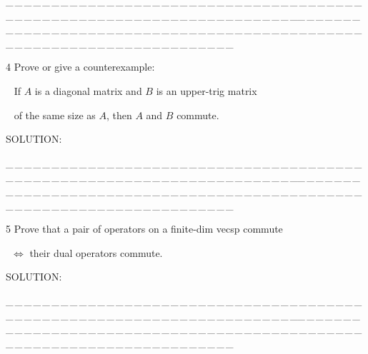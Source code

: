 \documentclass[a4paper, 11pt, UTF8]{article}
\begin{document}
\begin{large}
\par
{\tiny \_\,\_\,\_\,\_\,\_\,\_\,\_\,\_\,\_\,\_\,\_\,\_\,\_\,\_\,\_\,\_\,\_\,\_\,\_\,\_\,\_\,\_\,\_\,\_\,\_\,\_\,\_\,\_\,\_\,\_\,\_\,\_\,\_\,\_\,\_\,\_\,\_\,\_\,\_\,\_\,\_\,\_\,\_\,\_\,\_\,\_\,\_\,\_\,\_\,\_\,\_\,\_\,\_\,\_\,\_\,\_\,\_\,\_\,\_\,\_\,\_\,\_\,\_\,\_\,\_\,\_\,\_\,\_\,\_\,\_\,\_\_\,\_\,\_\,\_\,\_\,\_\,\_\,\_\,\_\,\_\,\_\,\_\,\_\,\_\,\_\,\_\,\_\,\_\,\_\,\_\,\_\,\_\,\_\,\_\,\_\,\_\,\_\,\_\,\_\,\_\,\_\,\_\,\_\,\_\,\_\,\_\,\_\,\_\,\_\,\_\,\_\,\_\,\_\,\_\,\_\,\_\,\_\,\_\,\_\,\_\,\_\,\_\,\_\,\_\,\_\,\_\,\_\,\_\,\_\,\_\,\_\,\_\,\_\,\_\,\_\,\_\,\_\,\_\,\_\,\_\,\_}\par

{\timesbf\Large 4} {\timessl\Large 
Prove or give a counterexample:}\par\,\,\,
{\timessl\Large If $A$ is a diagonal matrix and $B$ is an upper-trig matrix}\par\,\,\,
{\timessl\Large of the same size as $A$, then $A$ and $B$ commute.
}\par
{\timesbf S\footnotesize{OLUTION:}}\par\quad

\par
{\tiny \_\,\_\,\_\,\_\,\_\,\_\,\_\,\_\,\_\,\_\,\_\,\_\,\_\,\_\,\_\,\_\,\_\,\_\,\_\,\_\,\_\,\_\,\_\,\_\,\_\,\_\,\_\,\_\,\_\,\_\,\_\,\_\,\_\,\_\,\_\,\_\,\_\,\_\,\_\,\_\,\_\,\_\,\_\,\_\,\_\,\_\,\_\,\_\,\_\,\_\,\_\,\_\,\_\,\_\,\_\,\_\,\_\,\_\,\_\,\_\,\_\,\_\,\_\,\_\,\_\,\_\,\_\,\_\,\_\,\_\,\_\_\,\_\,\_\,\_\,\_\,\_\,\_\,\_\,\_\,\_\,\_\,\_\,\_\,\_\,\_\,\_\,\_\,\_\,\_\,\_\,\_\,\_\,\_\,\_\,\_\,\_\,\_\,\_\,\_\,\_\,\_\,\_\,\_\,\_\,\_\,\_\,\_\,\_\,\_\,\_\,\_\,\_\,\_\,\_\,\_\,\_\,\_\,\_\,\_\,\_\,\_\,\_\,\_\,\_\,\_\,\_\,\_\,\_\,\_\,\_\,\_\,\_\,\_\,\_\,\_\,\_\,\_\,\_\,\_\,\_\,\_}\par

{\timesbf\Large 5} {\timessl\Large 
Prove that a pair of operators on a finite-dim vecsp commute}\par\qquad\quad\,
{\timessl\Large $\Longleftrightarrow$ their dual operators commute.
}\par
{\timesbf S\footnotesize{OLUTION:}}\par\quad

\par
{\tiny \_\,\_\,\_\,\_\,\_\,\_\,\_\,\_\,\_\,\_\,\_\,\_\,\_\,\_\,\_\,\_\,\_\,\_\,\_\,\_\,\_\,\_\,\_\,\_\,\_\,\_\,\_\,\_\,\_\,\_\,\_\,\_\,\_\,\_\,\_\,\_\,\_\,\_\,\_\,\_\,\_\,\_\,\_\,\_\,\_\,\_\,\_\,\_\,\_\,\_\,\_\,\_\,\_\,\_\,\_\,\_\,\_\,\_\,\_\,\_\,\_\,\_\,\_\,\_\,\_\,\_\,\_\,\_\,\_\,\_\,\_\_\,\_\,\_\,\_\,\_\,\_\,\_\,\_\,\_\,\_\,\_\,\_\,\_\,\_\,\_\,\_\,\_\,\_\,\_\,\_\,\_\,\_\,\_\,\_\,\_\,\_\,\_\,\_\,\_\,\_\,\_\,\_\,\_\,\_\,\_\,\_\,\_\,\_\,\_\,\_\,\_\,\_\,\_\,\_\,\_\,\_\,\_\,\_\,\_\,\_\,\_\,\_\,\_\,\_\,\_\,\_\,\_\,\_\,\_\,\_\,\_\,\_\,\_\,\_\,\_\,\_\,\_\,\_\,\_\,\_\,\_}\par


\end{large}
\end{document}
